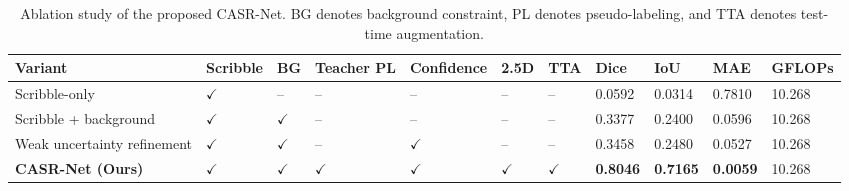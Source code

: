 \begin{table}
\caption{Ablation study of the proposed CASR-Net. BG denotes background constraint, PL denotes pseudo-labeling, and TTA denotes test-time augmentation.}
\label{tab:casrnet_ablation_clean}
\begin{tabular}{lllllllllll}
\toprule
Variant & Scribble & BG & Teacher PL & Confidence & 2.5D & TTA & Dice & IoU & MAE & GFLOPs \\
\midrule
Scribble-only & $\checkmark$ & -- & -- & -- & -- & -- & 0.0592 & 0.0314 & 0.7810 & 10.268 \\
Scribble + background & $\checkmark$ & $\checkmark$ & -- & -- & -- & -- & 0.3377 & 0.2400 & 0.0596 & 10.268 \\
Weak uncertainty refinement & $\checkmark$ & $\checkmark$ & -- & $\checkmark$ & -- & -- & 0.3458 & 0.2480 & 0.0527 & 10.268 \\
\textbf{CASR-Net (Ours)} & $\checkmark$ & $\checkmark$ & $\checkmark$ & $\checkmark$ & $\checkmark$ & $\checkmark$ & \textbf{0.8046} & \textbf{0.7165} & \textbf{0.0059} & 10.268 \\
\bottomrule
\end{tabular}
\end{table}
